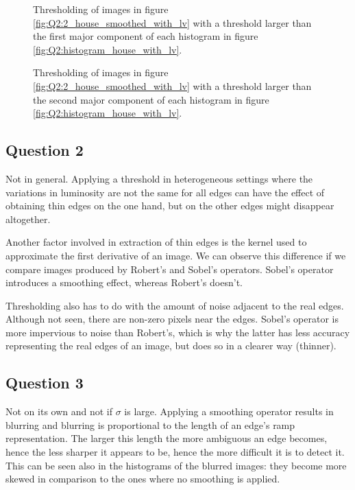 \begin{figure}[H]
	\centering
	\scalebox{0.9}{}
	\caption{Thresholding of images in figure \ref{fig:Q2:2_house_smoothed_with_lv} with a threshold larger than the first major component of 
	each histogram in figure \ref{fig:Q2:histogram_house_with_lv}.}
	\label{fig:Q2:threshold_house_1_with_lv}
\end{figure}

\begin{figure}[H]
	\centering
	\scalebox{0.9}{}
	\caption{Thresholding of images in figure \ref{fig:Q2:2_house_smoothed_with_lv} with a threshold larger than the second major component of 
	each histogram in figure \ref{fig:Q2:histogram_house_with_lv}.}
	\label{fig:Q2:threshold_house_2_with_lv}
\end{figure}



\subsection{Question 2}

Not in general. Applying a threshold in heterogeneous settings where the variations in luminosity are not the same for all edges can have the effect of 
obtaining thin edges on the one hand, but on the other edges might disappear altogether.

Another factor involved in extraction of thin edges is the kernel used to approximate the first derivative of an image. 
We can observe this difference if we compare images produced by Robert's and Sobel's operators. Sobel's operator introduces a smoothing effect, whereas Robert's doesn't.

Thresholding also has to do with the amount of noise adjacent to the real edges. Although not seen, there are non-zero pixels near the edges.
Sobel's operator is more impervious to noise than Robert's, which is why the latter has less accuracy representing the real edges of an image, but
does so in a clearer way (thinner).


\subsection{Question 3}

Not on its own and not if $\sigma$ is large. Applying a smoothing operator results in blurring and blurring is proportional to the length of an 
edge's ramp representation. The larger this length
the more ambiguous an edge becomes, hence the less sharper it appears to be, hence the more difficult it is to detect it. This can be seen also in the histograms 
of the blurred images: they become more skewed in comparison to the ones where no smoothing is applied. 

